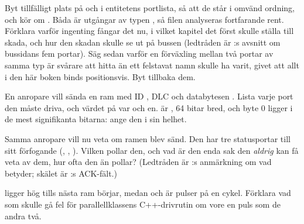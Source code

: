  Byt tillfälligt plats på  och  i entitetens portlista, så att de
står i omvänd ordning, och kör om . Båda är utgångar av typen
, så filen analyseras fortfarande rent. Förklara varför ingenting fångar det nu, i
vilket kapitel det först skulle ställa till skada, och hur den skadan skulle se ut på bussen
(ledtråden är :s avsnitt om bussidans fem portar). Säg sedan varför en
förväxling mellan två portar av samma typ är svårare att hitta än ett felstavat namn skulle ha varit,
givet att allt i den här boken binds positionsvis. Byt tillbaka dem.

\label{c11:ex:iface}
 En anropare vill sända en ram med ID , DLC  och databytesen
. Lista varje port den måste driva, och värdet på var och en.  är
, 64 bitar bred, och byte 0 ligger i de mest signifikanta bitarna: ange den i sin
helhet.

 Samma anropare vill nu veta om ramen blev sänd. Den har tre statusportar till sitt
förfogande (, , ). Vilken pollar den, och vad är den enda
sak den \emph{aldrig} kan få veta av dem, hur ofta den än pollar? (Ledtråden är
:s anmärkning om vad  betyder; skälet är
:s ACK-fält.)

  ligger hög tills nästa ram börjar, medan  och 
är pulser på en cykel. Förklara vad som skulle gå fel för parallellklassens C++-drivrutin om
 vore en puls som de andra två.
